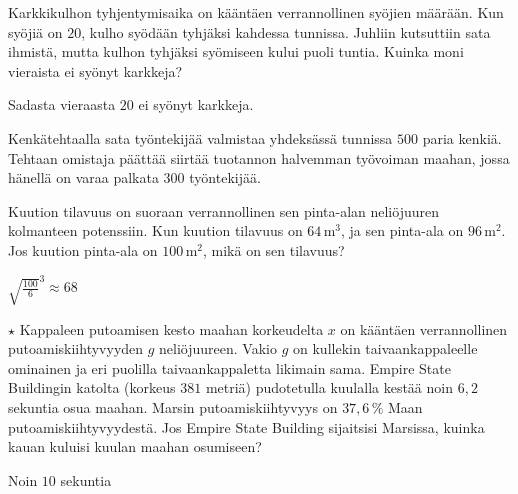 \begin{tehtavasivu}
\begin{tehtava}
	Karkkikulhon tyhjentymisaika on kääntäen verrannollinen syöjien määrään. Kun syöjiä on $20$, kulho syödään tyhjäksi kahdessa tunnissa. Juhliin kutsuttiin sata ihmistä, mutta kulhon tyhjäksi syömiseen kului puoli tuntia. Kuinka moni vieraista ei syönyt karkkeja?
	\begin{vastaus}
		Sadasta vieraasta $20$ ei syönyt karkkeja.
	\end{vastaus}
\end{tehtava}

\begin{tehtava}
Kenkätehtaalla sata työntekijää valmistaa yhdeksässä tunnissa $500$ paria kenkiä. Tehtaan omistaja päättää siirtää tuotannon halvemman työvoiman maahan, jossa hänellä on varaa palkata $300$ työntekijää. 

	\begin{vastaus}
	\end{vastaus}
\end{tehtava}

\begin{tehtava}
	Kuution tilavuus on suoraan verrannollinen sen pinta-alan neliöjuuren kolmanteen potenssiin. Kun kuution tilavuus on $64$\,m$^3$, ja sen pinta-ala on $96$\,m$^2$. Jos kuution pinta-ala on $100$\,m$^2$, mikä on sen tilavuus?
	\begin{vastaus}
		${\sqrt{\frac{100}{6}}}^{3} \approx 68$
	\end{vastaus}
\end{tehtava}

\begin{tehtava} $\star$ Kappaleen putoamisen kesto maahan korkeudelta $x$ on kääntäen verrannollinen putoamiskiihtyvyyden $g$ neliöjuureen. Vakio $g$ on kullekin taivaankappaleelle ominainen ja eri puolilla taivaankappaletta likimain sama. Empire State Buildingin katolta (korkeus $381$ metriä) pudotetulla kuulalla kestää noin $6,2$ sekuntia osua maahan. Marsin putoamiskiihtyvyys on $37,6\,\%$ Maan putoamiskiihtyvyydestä. Jos Empire State Building sijaitsisi Marsissa, kuinka kauan kuluisi kuulan maahan osumiseen?
    \begin{vastaus}
        Noin $10$ sekuntia
    \end{vastaus}
\end{tehtava}
\end{tehtavasivu}